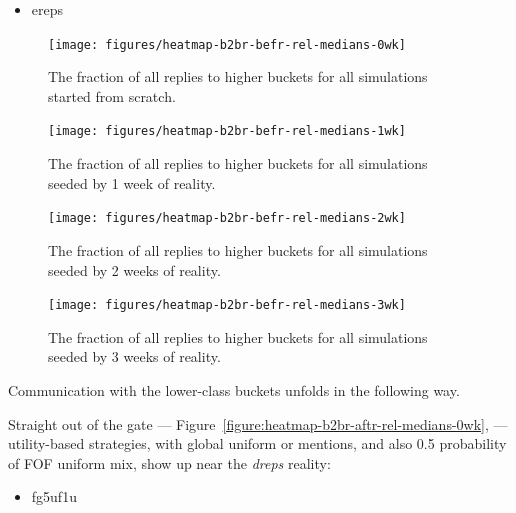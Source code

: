 \documentclass[10pt,oneside]{memoir}
\begin{document}
\begin{Spacing}{2}
\begin{itemize}
\item ereps
\end{itemize}


\begin{figure}
\begin{center}
    \texttt{[image: figures/heatmap-b2br-befr-rel-medians-0wk]}
    \caption{The fraction of all replies to higher buckets for all simulations started from scratch.}
    \label{figure:heatmap-b2br-befr-rel-medians-0wk}
\end{center}
\end{figure}

\begin{figure}
\begin{center}
    \texttt{[image: figures/heatmap-b2br-befr-rel-medians-1wk]}
    \caption{The fraction of all replies to higher buckets for all simulations seeded by 1 week of reality.}
    \label{figure:heatmap-b2br-befr-rel-medians-1wk}
\end{center}
\end{figure}

\begin{figure}
\begin{center}
    \texttt{[image: figures/heatmap-b2br-befr-rel-medians-2wk]}
    \caption{The fraction of all replies to higher buckets for all simulations seeded by 2 weeks of reality.}
    \label{figure:heatmap-b2br-befr-rel-medians-2wk}
\end{center}
\end{figure}

\begin{figure}
\begin{center}
    \texttt{[image: figures/heatmap-b2br-befr-rel-medians-3wk]}
    \caption{The fraction of all replies to higher buckets for all simulations seeded by 3 weeks of reality.}
    \label{figure:heatmap-b2br-befr-rel-medians-3wk}
\end{center}
\end{figure}
Communication with the lower-class buckets unfolds in the following way.


Straight out of the gate --- Figure~\ref{figure:heatmap-b2br-aftr-rel-medians-0wk}, --- utility-based strategies, with global uniform or mentions, and also 0.5 probability of FOF uniform mix, show up near the {\itshape dreps} reality:


\begin{itemize}


\item fg5uf1u


\end{itemize}
\end{Spacing}
\end{document}
